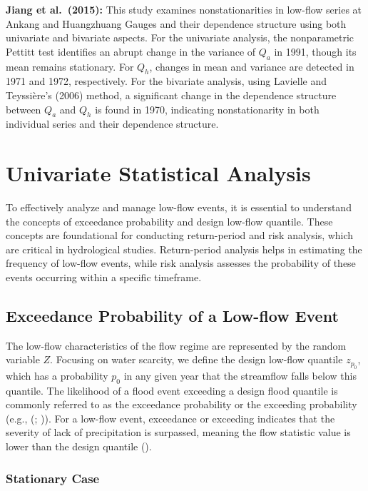 \documentclass[
]{krantz}
\begin{document}
\textbf{Jiang et al.~(2015):} This study examines nonstationarities in low-flow series at Ankang and Huangzhuang Gauges and their dependence structure using both univariate and bivariate aspects. For the univariate analysis, the nonparametric Pettitt test identifies an abrupt change in the variance of \(Q_{a}\) in 1991, though its mean remains stationary. For \(Q_{h}\), changes in mean and variance are detected in 1971 and 1972, respectively. For the bivariate analysis, using Lavielle and Teyssière's (2006) method, a significant change in the dependence structure between \(Q_{a}\) and \(Q_{h}\) is found in 1970, indicating nonstationarity in both individual series and their dependence structure.

\section{Univariate Statistical Analysis}\label{univariate-statistical-analysis}

To effectively analyze and manage low-flow events, it is essential to understand the concepts of exceedance probability and design low-flow quantile. These concepts are foundational for conducting return-period and risk analysis, which are critical in hydrological studies. Return-period analysis helps in estimating the frequency of low-flow events, while risk analysis assesses the probability of these events occurring within a specific timeframe.

\subsection{Exceedance Probability of a Low-flow Event}\label{exceedance-probability-of-a-low-flow-event}

The low-flow characteristics of the flow regime are represented by the random variable \(Z\). Focusing on water scarcity, we define the design low-flow quantile \(z_{p_{0}}\), which has a probability \(p_{0}\) in any given year that the streamflow falls below this quantile. The likelihood of a flood event exceeding a design flood quantile is commonly referred to as the exceedance probability or the exceeding probability (e.g., (\citet{Salas2013}; \citet{Salas2014})). For a low-flow event, exceedance or exceeding indicates that the severity of lack of precipitation is surpassed, meaning the flow statistic value is lower than the design quantile (\citet{Du2015}).

\subsubsection{Stationary Case}\label{stationary-case}
\end{document}
